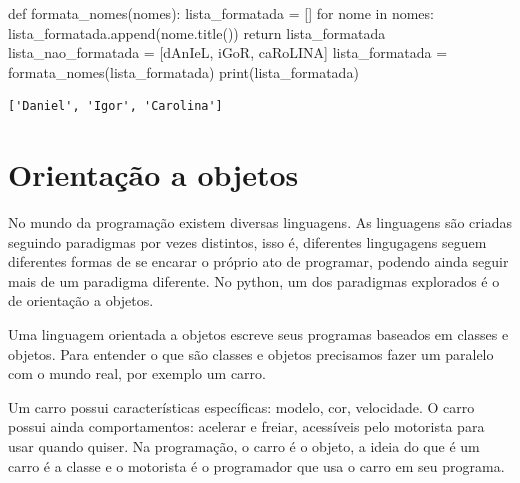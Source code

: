 \documentclass[
  letterpaper,
  DIV=11,
  numbers=noendperiod]{scrreprt}
\newenvironment{Shaded}{\begin{snugshade}}{\end{snugshade}}
\newcommand{\BuiltInTok}[1]{\textcolor[rgb]{0.00,0.23,0.31}{#1}}
\newcommand{\ControlFlowTok}[1]{\textcolor[rgb]{0.00,0.23,0.31}{#1}}
\newcommand{\KeywordTok}[1]{\textcolor[rgb]{0.00,0.23,0.31}{#1}}
\newcommand{\NormalTok}[1]{\textcolor[rgb]{0.00,0.23,0.31}{#1}}
\newcommand{\OperatorTok}[1]{\textcolor[rgb]{0.37,0.37,0.37}{#1}}
\newcommand{\StringTok}[1]{\textcolor[rgb]{0.13,0.47,0.30}{#1}}
\begin{document}
\begin{Shaded}
\begin{Highlighting}[]
\KeywordTok{def}\NormalTok{ formata\_nomes(nomes):}
\NormalTok{    lista\_formatada }\OperatorTok{=}\NormalTok{ []}
    \ControlFlowTok{for}\NormalTok{ nome }\KeywordTok{in}\NormalTok{ nomes:}
\NormalTok{        lista\_formatada.append(nome.title())     }
    \ControlFlowTok{return}\NormalTok{ lista\_formatada}
\NormalTok{lista\_nao\_formatada }\OperatorTok{=}\NormalTok{ [}\StringTok{\textquotesingle{}dAnIeL\textquotesingle{}}\NormalTok{, }\StringTok{\textquotesingle{}iGoR\textquotesingle{}}\NormalTok{, }\StringTok{\textquotesingle{}caRoLINA\textquotesingle{}}\NormalTok{]}
\NormalTok{lista\_formatada }\OperatorTok{=}\NormalTok{ formata\_nomes(lista\_formatada)}
\BuiltInTok{print}\NormalTok{(lista\_formatada)}
\end{Highlighting}
\end{Shaded}

\begin{tcolorbox}[enhanced jigsaw, breakable, leftrule=.75mm, left=2mm, opacityback=0, bottomrule=.15mm, toprule=.15mm, rightrule=.15mm, arc=.35mm, colback=white]

\begin{verbatim}
['Daniel', 'Igor', 'Carolina']
\end{verbatim}

\end{tcolorbox}


\hypertarget{orientauxe7uxe3o-a-objetos}{%
\chapter{Orientação a objetos}\label{orientauxe7uxe3o-a-objetos}}

No mundo da programação existem diversas linguagens. As linguagens são
criadas seguindo paradigmas por vezes distintos, isso é, diferentes
lingugagens seguem diferentes formas de se encarar o próprio ato de
programar, podendo ainda seguir mais de um paradigma diferente. No
python, um dos paradigmas explorados é o de orientação a objetos.

Uma linguagem orientada a objetos escreve seus programas baseados em
classes e objetos. Para entender o que são classes e objetos precisamos
fazer um paralelo com o mundo real, por exemplo um carro.

Um carro possui características específicas: modelo, cor, velocidade. O
carro possui ainda comportamentos: acelerar e freiar, acessíveis pelo
motorista para usar quando quiser. Na programação, o carro é o objeto, a
ideia do que é um carro é a classe e o motorista é o programador que usa
o carro em seu programa.
\end{document}
